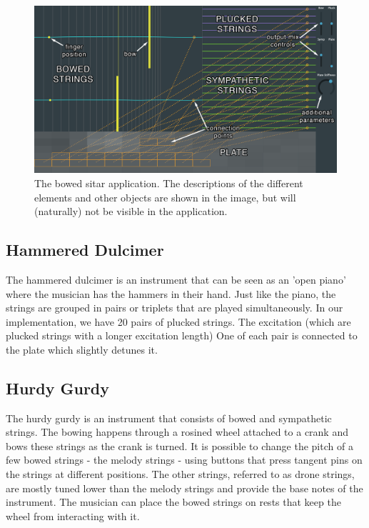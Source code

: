 \documentclass{article}
\begin{document}
\begin{figure}[h]
\centering
\includegraphics[width=1.0\columnwidth]{BowedSitar.png}
\caption{The bowed sitar application. The descriptions of the different elements and other objects are shown in the image, but will (naturally) not be visible in the application. \label{fig:bowedSitar}}
\end{figure}

\subsection{Hammered Dulcimer}
The hammered dulcimer is an instrument that can be seen as an 'open piano' where the musician has the hammers in their hand. Just like the piano, the strings are grouped in pairs or triplets
that are played simultaneously. 
In our implementation, we have 20 pairs of plucked strings. The excitation (which are plucked strings with a longer excitation length) %
One of each pair is connected to the plate which slightly detunes it.


\subsection{Hurdy Gurdy}
The hurdy gurdy is an instrument that consists of bowed and sympathetic strings. The bowing happens through a rosined wheel attached to a crank and bows these strings as the crank is turned. It is possible to change the pitch of a few bowed strings - the melody strings - using buttons that press tangent pins on the strings at different positions. The other strings, referred to as drone strings, are mostly tuned lower than the melody strings and provide the base notes of the instrument. The musician can place the bowed strings on rests that keep the wheel from interacting with it. 
\end{document}
